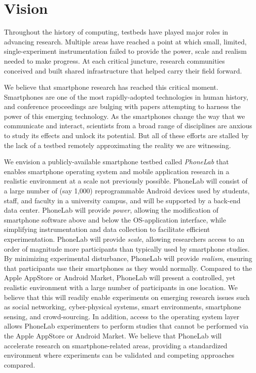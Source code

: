 \section{Vision}

Throughout the history of computing, testbeds have played major roles in
advancing research. Multiple areas have reached a point at which small,
limited, single-experiment instrumentation failed to provide the power, scale
and realism needed to make progress. At each critical juncture, research
communities conceived and built shared infrastructure that
helped carry their field forward.

We believe that smartphone research has reached this critical moment.
Smartphones are one of the most rapidly-adopted technologies in human history,
and conference proceedings are bulging with papers attempting to harness the
power of this emerging technology. As the smartphones change the way that we
communicate and interact, scientists from a broad range of disciplines are
anxious to study its effects and unlock its potential. But all of these efforts
are stalled by the lack of a testbed remotely approximating the reality we are
witnessing.

We envision a publicly-available smartphone testbed called \emph{PhoneLab} that
enables smartphone operating system and mobile application research in a
realistic environment at a scale not previously possible. PhoneLab will consist
of a large number of (say 1,000) reprogrammable Android devices used by
students, staff, and faculty in a university campus, and will be supported by a
back-end data center. PhoneLab will provide \emph{power}, allowing the
modification of smartphone software above and below the OS-application
interface, while simplifying instrumentation and data collection to
facilitate efficient experimentation. PhoneLab will provide \emph{scale},
allowing researchers access to an order of magnitude more participants
than typically used by smartphone studies. By minimizing experimental
disturbance, PhoneLab will provide \emph{realism}, ensuring that participants
use their smartphones as they would normally. Compared to the Apple AppStore
or Android Market, PhoneLab will present a controlled, yet realistic
environment with a large number of participants in one location. We believe that
this will readily enable experiments on emerging research issues such as
social networking, cyber-physical systems, smart environments, smartphone
sensing, and crowd-sourcing. In addition, access to the operating
system layer allows PhoneLab experimenters to perform studies that cannot be
performed via the Apple AppStore or Android Market. We believe
that PhoneLab will accelerate research on smartphone-related areas,
providing a standardized environment where experiments can be validated and
competing approaches compared.

